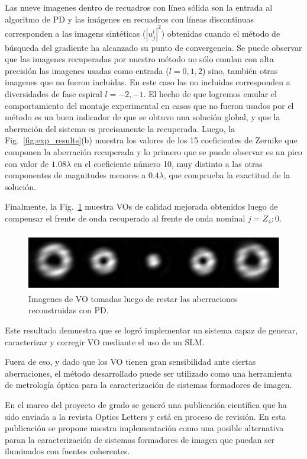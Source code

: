 Las nueve imagenes dentro de recuadros con línea sólida son la
entrada al algoritmo de PD y las imágenes en recuadros con líneas
discontinuas corresponden a las imagens sintéticas ($|u_j^l|^2$) obtenidas
cuando el método de búsqueda del gradiente ha alcanzado su punto de 
convergencia. Se puede observar que las imagenes
recuperadas por nuestro método no sólo emulan con alta precisión las
imagenes usadas como entrada ($l=0,1,2$) sino, también otras imagenes que no
fueron incluidas. En este caso las no incluidas corresponden a
diversidades de fase espiral $l=-2,-1$. El hecho de que logremos emular el comportamiento
del montaje experimental en casos que no fueron usados por el método
es un buen indicador de que se obtuvo una solución global, y que la
aberración del sistema es precisamente la recuperada. Luego, la
Fig.~\ref{fig:exp_results}(b) muestra los valores de los 15
coeficientes de 
Zernike que componen la aberración recuperada y lo primero que se puede
observar es un pico con valor de  $1.08\lambda$ en el coeficiente
número 10, muy distinto a las otras componentes de magnitudes menores
a $0.4\lambda$, que comprueba la exactitud de la solución.   

Finalmente, la Fig.~\ref{fig:exp_correction} muestra VOs de calidad mejorada obtenidos
luego de compensar el frente de onda recuperado al frente de
onda nominal $j = Z_4:0$.  

\begin{figure}[h!]
\centering
\includegraphics[scale=1.5]{PSF_comparison_experimental_results_07032015.pdf}
\caption[VO registrados luego restar las aberraciones detectadas
  con PD.]{Imagenes de VO tomadas luego de restar las aberraciones
    reconstruidas con PD.}  
\label{fig:exp_correction}
\end{figure}

Este resultado demuestra que se logró implementar un sistema capaz de
generar, caracterizar y corregir VO mediante el uso de un SLM. 

Fuera de eso, y dado que los VO tienen gran sensibilidad ante ciertas
aberraciones, el método desarrollado puede ser utilizado como una
herramienta de metrología óptica para la caracterización de sistemas
formadores de imagen. 

En el marco del proyecto de grado se generó una
publicación científica que ha sido enviada a la revista Optics Letters
y está en proceso de revisión. En esta publicación se propone nuestra implementación
como una posible alternativa paran la caracterización de sistemas
formadores de imagen que puedan ser iluminados con fuentes
coherentes. 

\newpage
\pagebreak[4]

